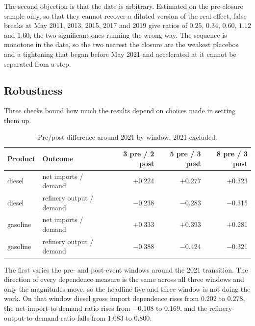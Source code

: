 \documentclass[11pt,a4paper]{article}
\begin{document}
The second objection is that the date is arbitrary. Estimated on the pre-closure sample only, so
that they cannot recover a diluted version of the real effect, false breaks at May 2011, 2013,
2015, 2017 and 2019 give ratios of $0.25$, $0.34$, $0.60$, $1.12$ and $1.60$, the two
significant ones running the wrong way. The sequence is monotone in the date, so the two nearest
the closure are the weakest placebos and a tightening that began before May 2021 and accelerated
at it cannot be separated from a step.

\subsection{Robustness}

Three checks bound how much the results depend on choices made in setting them up.

\begin{table}[htbp]
\centering
\caption{Pre/post difference around 2021 by window, 2021 excluded.}
\label{tab:windows}
\begin{tabular}{llrrr}
\toprule
Product & Outcome & 3 pre / 2 post & 5 pre / 3 post & 8 pre / 3 post \\
\midrule
diesel & net imports / demand & $+$0.224 & $+$0.277 & $+$0.323 \\
diesel & refinery output / demand & $-$0.238 & $-$0.283 & $-$0.315 \\
gasoline & net imports / demand & $+$0.333 & $+$0.393 & $+$0.281 \\
gasoline & refinery output / demand & $-$0.388 & $-$0.424 & $-$0.321 \\
\bottomrule
\end{tabular}
\end{table}

The first varies the pre- and post-event windows around the 2021 transition. The direction of
every dependence measure is the same across all three windows and only the magnitudes move, so
the headline five-and-three window is not doing the work. On that window diesel gross import
dependence rises from $0.202$ to $0.278$, the net-import-to-demand ratio rises from $-0.108$ to
$0.169$, and the refinery-output-to-demand ratio falls from $1.083$ to $0.800$.
\end{document}
